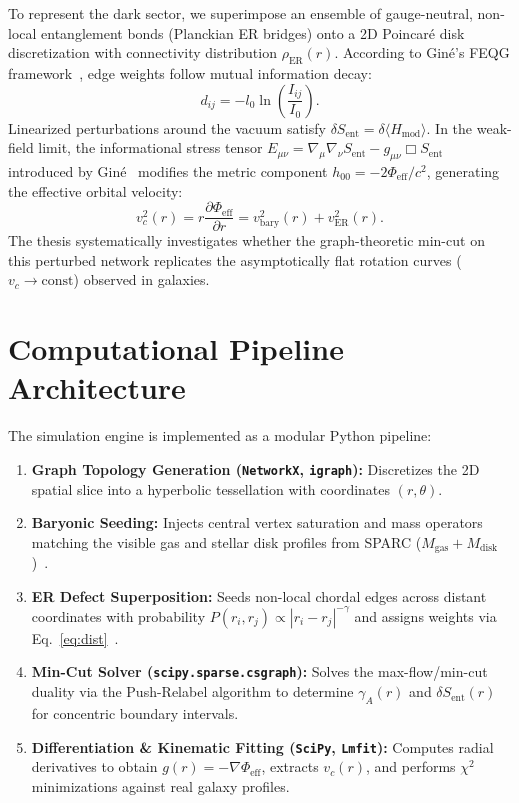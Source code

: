 \documentclass[10pt,a4paper]{article}
\begin{document}
To represent the dark sector, we superimpose an ensemble of gauge-neutral, non-local entanglement bonds (Planckian ER bridges) onto a 2D Poincar\'e disk discretization with connectivity distribution $\rho_{\mathrm{ER}}(r)$. According to Gin\'e's FEQG framework~\cite{gine2026}, edge weights follow mutual information decay:
\begin{equation}
d_{ij} = -l_0 \ln\left(\frac{I_{ij}}{I_0}\right).
\label{eq:dist}
\end{equation}
Linearized perturbations around the vacuum satisfy $\delta S_{\text{ent}} = \delta \langle H_{\text{mod}} \rangle$. In the weak-field limit, the informational stress tensor $E_{\mu\nu} = \nabla_\mu \nabla_\nu S_{\text{ent}} - g_{\mu\nu}\Box S_{\text{ent}}$ introduced by Gin\'e~\cite{gine2026} modifies the metric component $h_{00} = -2\Phi_{\text{eff}}/c^2$, generating the effective orbital velocity:
\begin{equation}
v_c^2(r) = r \frac{\partial \Phi_{\text{eff}}}{\partial r} = v_{\text{bary}}^2(r) + v_{\text{ER}}^2(r).
\label{eq:vc}
\end{equation}
The thesis systematically investigates whether the graph-theoretic min-cut on this perturbed network replicates the asymptotically flat rotation curves ($v_c \to \text{const}$) observed in galaxies.

\section{Computational Pipeline Architecture}
\label{sec:pipeline}

The simulation engine is implemented as a modular Python pipeline:
\begin{enumerate}\setlength{\itemsep}{1pt}
    \item \textbf{Graph Topology Generation (\texttt{NetworkX}, \texttt{igraph}):} Discretizes the 2D spatial slice into a hyperbolic tessellation with coordinates $(r, \theta)$.
    \item \textbf{Baryonic Seeding:} Injects central vertex saturation and mass operators matching the visible gas and stellar disk profiles from SPARC ($M_{\text{gas}} + M_{\text{disk}}$)~\cite{sparc2016}.
    \item \textbf{ER Defect Superposition:} Seeds non-local chordal edges across distant coordinates with probability $P(r_i, r_j) \propto |r_i - r_j|^{-\gamma}$ and assigns weights via Eq.~\eqref{eq:dist}~\cite{gine2026}.
    \item \textbf{Min-Cut Solver (\texttt{scipy.sparse.csgraph}):} Solves the max-flow/min-cut duality via the Push-Relabel algorithm to determine $\gamma_A(r)$ and $\delta S_{\text{ent}}(r)$ for concentric boundary intervals.
    \item \textbf{Differentiation \& Kinematic Fitting (\texttt{SciPy}, \texttt{Lmfit}):} Computes radial derivatives to obtain $g(r) = -\nabla \Phi_{\text{eff}}$, extracts $v_c(r)$, and performs $\chi^2$ minimizations against real galaxy profiles.
\end{enumerate}
\end{document}
